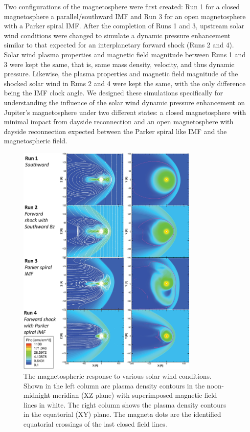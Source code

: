 Two configurations of the magnetosphere were first created: Run 1 for a closed magnetosphere a parallel/southward IMF and Run 3 for an open magnetosphere with a Parker spiral IMF. After the completion of Runs 1 and 3, upstream solar wind conditions were changed to simulate a dynamic pressure enhancement similar to that expected for an interplanetary forward shock (Runs 2 and 4). Solar wind plasma properties and magnetic field magnitude between Runs 1 and 3 were kept the same, that is, same mass density, velocity, and thus dynamic pressure. Likewise, the plasma properties and magnetic field magnitude of the shocked solar wind in Runs 2 and 4 were kept the same, with the only difference being the IMF clock angle. We designed these simulations specifically for understanding the influence of the solar wind dynamic pressure enhancement on Jupiter's magnetosphere under two different states: a closed magnetosphere with minimal impact from dayside reconnection and an open magnetosphere with dayside reconnection expected between the Parker spiral like IMF and the magnetospheric field.

\begin{figure}
    \centering
    \includegraphics[width=0.8\textwidth]{images3/mhd-solarwind-upstream.jpg}
    \caption{The magnetospheric response to various solar wind conditions. Shown in the left column are plasma density contours in the noon-midnight meridian (XZ plane) with superimposed magnetic field lines in white. The right column shows the plasma density contours in the equatorial (XY) plane. The magneta dots are the identified equatorial crossings of the last closed field lines.}
    \label{fig:mhd-solarwind-upstream}
\end{figure}


